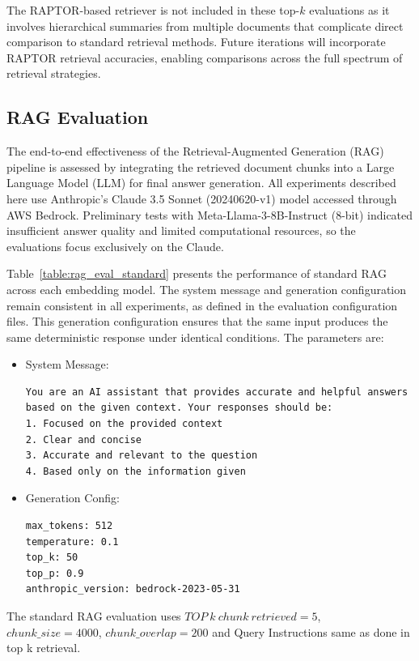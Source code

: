 \documentclass{scrartcl}
\begin{document}
The RAPTOR-based retriever is not included in these top-$k$ evaluations as it involves hierarchical summaries from multiple documents that complicate direct comparison to standard retrieval methods. Future iterations will incorporate RAPTOR retrieval accuracies, enabling comparisons across the full spectrum of retrieval strategies.

\subsection{RAG Evaluation}

The end-to-end effectiveness of the Retrieval-Augmented Generation (RAG) pipeline is assessed by integrating the retrieved document chunks into a Large Language Model (LLM) for final answer generation. All experiments described here use Anthropic's Claude 3.5 Sonnet (20240620-v1) model accessed through AWS Bedrock. Preliminary tests with Meta-Llama-3-8B-Instruct (8-bit) indicated insufficient answer quality and limited computational resources, so the evaluations focus exclusively on the Claude.

Table~\ref{table:rag_eval_standard} presents the performance of standard RAG across each embedding model. The system message and generation configuration remain consistent in all experiments, as defined in the evaluation configuration files. This generation configuration ensures that the same input produces the same deterministic response under identical conditions. The parameters are:

\begin{itemize}
    \item System Message:
\begin{verbatim}
You are an AI assistant that provides accurate and helpful answers
based on the given context. Your responses should be:
1. Focused on the provided context
2. Clear and concise
3. Accurate and relevant to the question
4. Based only on the information given
\end{verbatim}

    \item Generation Config:
\begin{verbatim}
max_tokens: 512
temperature: 0.1
top_k: 50
top_p: 0.9
anthropic_version: bedrock-2023-05-31
\end{verbatim}
\end{itemize}

The standard RAG evaluation uses $TOP\ k\ chunk\ retrieved =5$, $chunk\_size=4000$, $chunk\_overlap=200$ and Query Instructions  same as done in top k retrieval.
\end{document}

